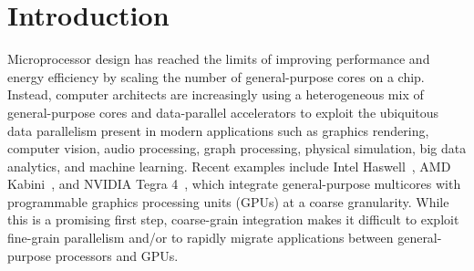 
\section{Introduction}
\label{sec-intro}

\begin{figure}[b]
  \begin{minipage}[b]{0.42\tw}
    
  \end{minipage}%
  \hfill%
  \begin{minipage}[b]{0.56\tw}
    
  \end{minipage}
\end{figure}

Microprocessor design has reached the limits of improving performance and
energy efficiency by scaling the number of general-purpose cores on a
chip. Instead, computer architects are increasingly using a heterogeneous
mix of general-purpose cores and data-parallel accelerators to exploit
the ubiquitous data parallelism present in modern applications such as
graphics rendering, computer vision, audio processing, graph processing,
physical simulation, big data analytics, and machine learning. Recent
examples include Intel
Haswell~\cite{hammarlund-intel-haswell-ieeemicro2014}, AMD
Kabini~\cite{bouvier-amd-kabini-ieeemicro2014}, and NVIDIA Tegra
4~\cite{krewell-nvidia-tegra4-mpr2013}, which integrate general-purpose
multicores with programmable graphics processing units (GPUs) at a coarse
granularity. While this is a promising first step, coarse-grain
integration makes it difficult to exploit fine-grain parallelism and/or
to rapidly migrate applications between general-purpose processors and
GPUs. 

